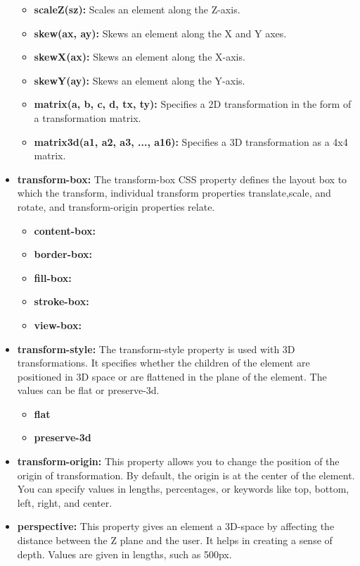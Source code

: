 \documentclass{report}
\begin{document}
\begin{itemize}
\begin{itemize}
            \item \textbf{scaleZ(sz):} Scales an element along the Z-axis.
            \item \textbf{skew(ax, ay):} Skews an element along the X and Y axes.
            \item \textbf{skewX(ax):} Skews an element along the X-axis.
            \item \textbf{skewY(ay):} Skews an element along the Y-axis.
            \item \textbf{matrix(a, b, c, d, tx, ty):} Specifies a 2D transformation in the form of a transformation matrix.
            \item \textbf{matrix3d(a1, a2, a3, ..., a16):} Specifies a 3D transformation as a 4x4 matrix.
        \end{itemize}
        \item \textbf{transform-box:} The transform-box CSS property defines the layout box to which the transform, individual transform properties translate,scale, and rotate, and transform-origin properties relate.
            \begin{itemize}
                \item \textbf{content-box:}
                \item \textbf{border-box:}
                \item \textbf{fill-box:}
                \item \textbf{stroke-box:}
                \item \textbf{view-box:}
            \end{itemize}
        \item \textbf{transform-style:} The transform-style property is used with 3D transformations. It specifies whether the children of the element are positioned in 3D space or are flattened in the plane of the element. The values can be flat or preserve-3d.
            \begin{itemize}
                \item \textbf{flat}
                \item \textbf{preserve-3d}
            \end{itemize}
        \item \textbf{transform-origin:} This property allows you to change the position of the origin of transformation. By default, the origin is at the center of the element. You can specify values in lengths, percentages, or keywords like top, bottom, left, right, and center.
        \item \textbf{perspective:} This property gives an element a 3D-space by affecting the distance between the Z plane and the user. It helps in creating a sense of depth. Values are given in lengths, such as 500px.

\end{itemize}
\end{document}
